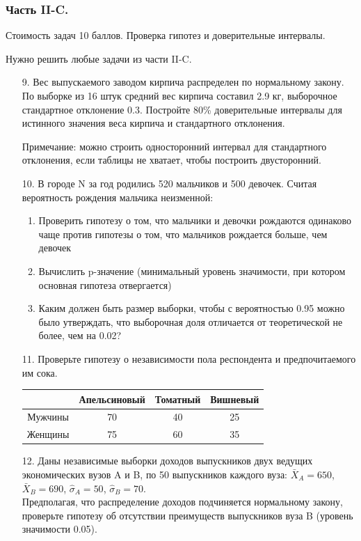 \documentclass[12pt, a4paper]{article}\usepackage[]{graphicx}\usepackage[]{color}
\begin{document}
\subsubsection*{Часть II-C.}

Стоимость задач 10 баллов. Проверка гипотез и доверительные интервалы.

Нужно решить любые \textbf{} задачи из части II-C.

\begin{enumerate}
\item[9.] Вес выпускаемого заводом кирпича распределен по нормальному закону. По выборке из 16 штук средний вес кирпича составил 2.9 кг, выборочное стандартное отклонение 0.3. Постройте 80\% доверительные интервалы для истинного значения веса кирпича и стандартного отклонения.

Примечание: можно строить односторонний интервал для стандартного отклонения, если таблицы не хватает, чтобы построить двусторонний.

\item[10.] В городе N за год родились 520 мальчиков и 500 девочек. Считая вероятность рождения мальчика неизменной:
\begin{enumerate}
\item Проверить гипотезу о том, что мальчики и девочки рождаются одинаково чаще против гипотезы о том, что мальчиков рождается больше, чем девочек
\item Вычислить p-значение (минимальный уровень значимости, при котором основная гипотеза отвергается)
\item Каким должен быть размер выборки, чтобы с вероятностью 0.95 можно было утверждать, что выборочная доля отличается от теоретической не более, чем на 0.02?
\end{enumerate}

\item[11.] Проверьте гипотезу о независимости пола респондента и предпочитаемого им сока.

\begin{tabular}{|c|c|c|c|}
  \hline
   & Апельсиновый & Томатный & Вишневый  \\
  \hline
  Мужчины & 70 & 40 & 25  \\
  Женщины & 75 & 60 & 35  \\
  \hline
\end{tabular}

\item[12.] Даны независимые выборки доходов выпускников двух ведущих экономических вузов A и B, по 50 выпускников каждого вуза: $\bar{X}_{A}=650$, $\bar{X}_{B}=690$, $\hat{\sigma}_{A}=50$, $\hat{\sigma}_{B}=70$. \\ Предполагая, что распределение доходов подчиняется нормальному закону, проверьте гипотезу об отсутствии преимуществ выпускников вуза B (уровень значимости 0.05).


\end{enumerate}
\end{document}
